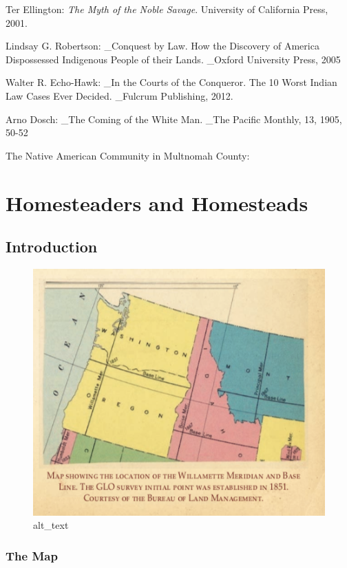 \documentclass[
  12pt,
]{book}
\begin{document}
Ter Ellington: \emph{The Myth of the Noble Savage}. University of California Press, 2001.

Lindsay G. Robertson: \_Conquest by Law. How the Discovery of America Dispossessed Indigenous People of their Lands. \_Oxford University Press, 2005

Walter R. Echo-Hawk: \_In the Courts of the Conqueror. The 10 Worst Indian Law Cases Ever Decided. \_Fulcrum Publishing, 2012.

Arno Dosch: \_The Coming of the White Man. \_The Pacific Monthly, 13, 1905, 50-52

The Native American Community in Multnomah County:

\hypertarget{homesteaders-and-homesteads}{%
\chapter{Homesteaders and Homesteads}\label{homesteaders-and-homesteads}}

\hypertarget{introduction-1}{%
\section{Introduction}\label{introduction-1}}

\begin{figure}
\centering
\includegraphics{images/02_images/image1.png}
\caption{alt\_text}
\end{figure}

\hypertarget{the-map}{%
\subsection{The Map}\label{the-map}}
\end{document}
